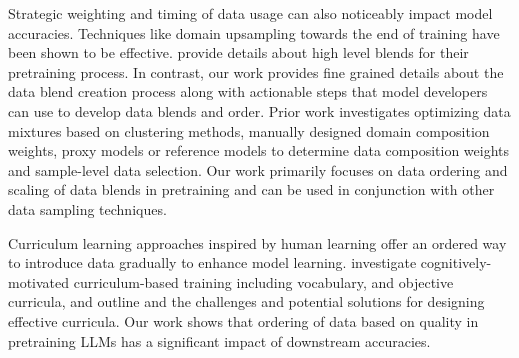 \documentclass[11pt]{article}
\newcommand{\todo}[1]{{\color{red}\bf [TODO: #1]}\xspace}
\begin{document}
Strategic weighting and timing of data usage can also noticeably impact model accuracies. 
Techniques like domain upsampling \cite{domain-upsampling-blakeney2024doesdatasparkjoy,llama3-dubey2024llama3herdmodels} towards the end of training have been shown to be effective.
\citet{snowflake-arctic,olmo-groeneveld-etal-2024-olmo} provide details about high level blends for their pretraining process.
In contrast, our work provides fine grained details about the data blend creation process along with actionable steps that model developers can use to develop data blends and order.
Prior work \cite{shen2023slimpajama,longpre2024pretrainer,pmlr-v162-mindermann22a,doremi-NEURIPS2023_dcba6be9,xie2023data,shao2024balanced} investigates optimizing data mixtures based on clustering methods, manually designed domain composition weights, proxy models or reference models to determine data composition weights and sample-level data selection. 
Our work primarily focuses on data ordering and scaling of data blends in pretraining and can be used in conjunction with other data sampling techniques.

Curriculum learning approaches inspired by human learning offer an ordered way to introduce data gradually to enhance model learning. 
\citet{martinez-etal-2023-climb,curriculum-survey,feng-etal-2024-child} investigate cognitively-motivated curriculum-based training including vocabulary, and objective curricula, and outline and the challenges and potential solutions for designing effective curricula. 
Our work shows that ordering of data based on quality in pretraining LLMs has a significant impact of downstream accuracies.
\end{document}
